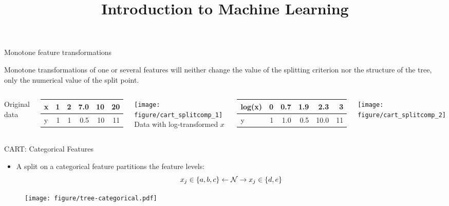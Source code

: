 \documentclass[11pt,compress,t,notes=noshow, xcolor=table]{beamer}
\title{Introduction to Machine Learning}
\institute{\href{https://compstat-lmu.github.io/lecture_i2ml/}{compstat-lmu.github.io/lecture\_i2ml}}
\date{}
\begin{document}

\sloppy

\begin{vbframe}{Monotone feature transformations}

Monotone transformations of one or several features will neither change the value of the splitting criterion nor the structure of the tree,  only the numerical value of the split point.
\vspace{0.5cm}
\begin{columns}[T]
Original data
\begin{knitrout}\scriptsize
{}\color{fgcolor}
\begin{tabular}{l|r|r|r|r|r}
\hline
x & 1 & 2 & 7.0 & 10 & 20\\
\hline
y & 1 & 1 & 0.5 & 10 & 11\\
\hline
\end{tabular}


\end{knitrout}
\texttt{[image: figure/cart\_splitcomp\_1]}
Data with log-transformed $x$
\begin{knitrout}\scriptsize
{}\color{fgcolor}
\begin{tabular}{l|r|r|r|r|r}
\hline
log(x) & 0 & 0.7 & 1.9 & 2.3 & 3\\
\hline
y & 1 & 1.0 & 0.5 & 10.0 & 11\\
\hline
\end{tabular}


\end{knitrout}
\texttt{[image: figure/cart\_splitcomp\_2]}
\end{columns}
\vspace{0.5cm}
\centering
\end{vbframe}

\begin{vbframe}{CART: Categorical Features}
  \begin{itemize}
  \item A split on a categorical feature partitions the feature levels:
    $$x_j \in \{a,b,c\} \leftarrow \mathcal{N} \rightarrow x_j \in \{d,e\} $$
  \end{itemize}
  \begin{figure}
   \texttt{[image: figure/tree-categorical.pdf]} 
  \end{figure}
  \end{vbframe}
  
\end{document}
